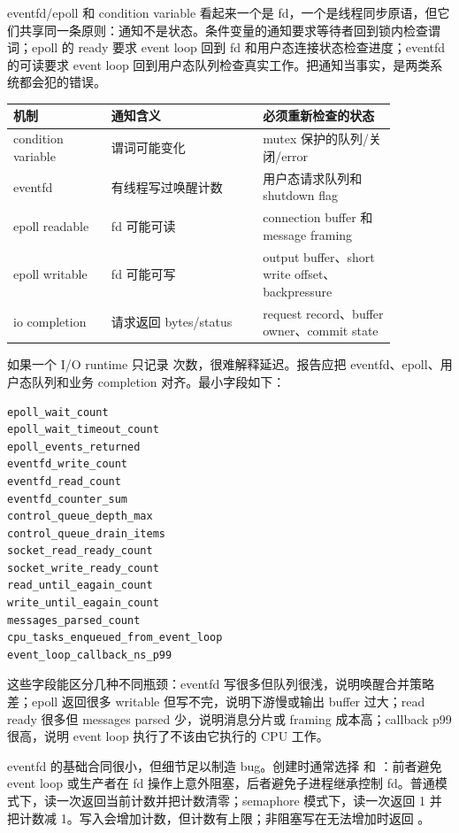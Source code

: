 eventfd/epoll 和 condition variable 看起来一个是 fd，一个是线程同步原语，但它们共享同一条原则：通知不是状态。条件变量的通知要求等待者回到锁内检查谓词；epoll 的 ready 要求 event loop 回到 fd 和用户态连接状态检查进度；eventfd 的可读要求 event loop 回到用户态队列检查真实工作。把通知当事实，是两类系统都会犯的错误。

\begin{center}
\small
\begin{tabular}{p{0.22\linewidth}p{0.34\linewidth}p{0.30\linewidth}}
\toprule
机制 & 通知含义 & 必须重新检查的状态 \\
\midrule
condition variable & 谓词可能变化 & mutex 保护的队列/关闭/error \\
eventfd & 有线程写过唤醒计数 & 用户态请求队列和 shutdown flag \\
epoll readable & fd 可能可读 & connection buffer 和 message framing \\
epoll writable & fd 可能可写 & output buffer、short write offset、backpressure \\
io completion & 请求返回 bytes/status & request record、buffer owner、commit state \\
\bottomrule
\end{tabular}
\end{center}

如果一个 I/O runtime 只记录  次数，很难解释延迟。报告应把 eventfd、epoll、用户态队列和业务 completion 对齐。最小字段如下：

\begin{lstlisting}[numbers=none,caption={eventfd/epoll runtime 的观测字段}]
epoll_wait_count
epoll_wait_timeout_count
epoll_events_returned
eventfd_write_count
eventfd_read_count
eventfd_counter_sum
control_queue_depth_max
control_queue_drain_items
socket_read_ready_count
socket_write_ready_count
read_until_eagain_count
write_until_eagain_count
messages_parsed_count
cpu_tasks_enqueued_from_event_loop
event_loop_callback_ns_p99
\end{lstlisting}

这些字段能区分几种不同瓶颈：eventfd 写很多但队列很浅，说明唤醒合并策略差；epoll 返回很多 writable 但写不完，说明下游慢或输出 buffer 过大；read ready 很多但 messages parsed 少，说明消息分片或 framing 成本高；callback p99 很高，说明 event loop 执行了不该由它执行的 CPU 工作。

eventfd 的基础合同很小，但细节足以制造 bug。创建时通常选择  和 ：前者避免 event loop 或生产者在 fd 操作上意外阻塞，后者避免子进程继承控制 fd。普通模式下，读一次返回当前计数并把计数清零；semaphore 模式下，读一次返回 1 并把计数减 1。写入会增加计数，但计数有上限；非阻塞写在无法增加时返回 。

